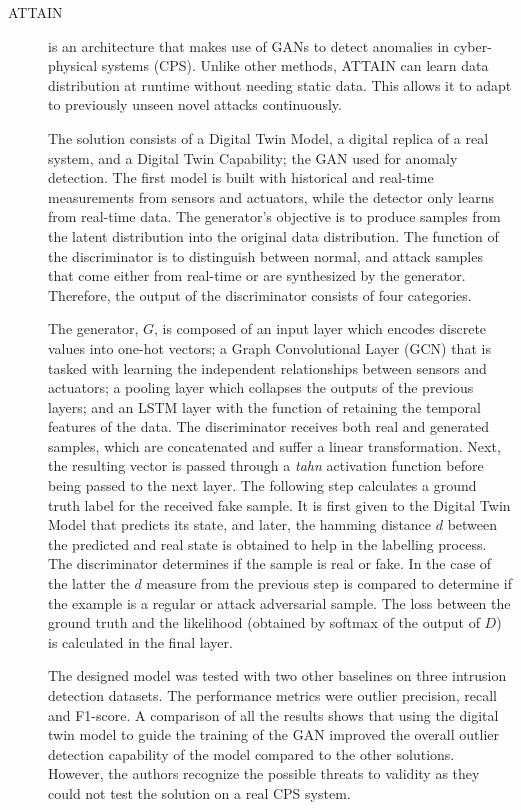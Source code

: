 \begin{description}
    \item[ATTAIN \cite{xu.etal_DigitalTwinbasedAnomaly_2021}] is an architecture that makes use of GANs to detect anomalies in cyber-physical systems (CPS). Unlike other methods, ATTAIN can learn data distribution at runtime without needing static data. This allows it to adapt to previously unseen novel attacks continuously. 

    The solution consists of a Digital Twin Model, a digital replica of a real system, and a Digital Twin Capability; the GAN used for anomaly detection. The first model is built with historical and real-time measurements from sensors and actuators, while the detector only learns from real-time data. The generator's objective is to produce samples from the latent distribution into the original data distribution. The function of the discriminator is to distinguish between normal, and attack samples that come either from real-time or are synthesized by the generator. Therefore, the output of the discriminator consists of four categories. 

    The generator, $G$, is composed of an input layer which encodes discrete values into one-hot vectors; a Graph Convolutional Layer (GCN) that is tasked with learning the independent relationships between sensors and actuators; a pooling layer which collapses the outputs of the previous layers; and an LSTM layer with the function of retaining the temporal features of the data. The discriminator receives both real and generated samples, which are concatenated and suffer a linear transformation. Next, the resulting vector is passed through a \textit{tahn} activation function before being passed to the next layer. The following step calculates a ground truth label for the received fake sample. It is first given to the Digital Twin Model that predicts its state, and later, the hamming distance $d$ between the predicted and real state is obtained to help in the labelling process. The discriminator determines if the sample is real or fake. In the case of the latter the $d$ measure from the previous step is compared to determine if the example is a regular or attack adversarial sample. The loss between the ground truth and the likelihood (obtained by softmax of the output of $D$) is calculated in the final layer.

    The designed model was tested with two other baselines on three intrusion detection datasets. The performance metrics were outlier precision, recall and F1-score. A comparison of all the results shows that using the digital twin model to guide the training of the GAN improved the overall outlier detection capability of the model compared to the other solutions. However, the authors recognize the possible threats to validity as they could not test the solution on a real CPS system. 
\end{description}


